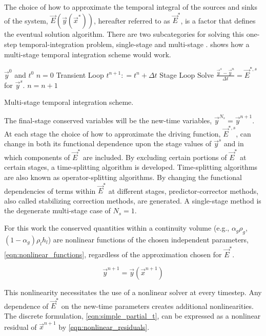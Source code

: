 The choice of how to approximate the temporal integral of the sources and sinks of the system, $\vec{E}(\vec{y}(\vec{x}^{*}))$, hereafter referred to as $\vec{E}^{*}$, is a factor that defines the eventual solution algorithm.
There are two subcategories for solving this one-step temporal-integration problem, single-stage and multi-stage \cite{Stewart1981,LeVeque2007}.
 shows how a multi-stage temporal integration scheme would work.

\begin{algo}[ht!]
\setlength{\baselineskip}{0.625\baselineskip}
\begin{algorithmic}[1]
\Require $\vec{y}^{0}$ and $t^{0}$
\Set $n = 0$
\Loop \; Transient Loop
    \State $t^{n+1} : = t^{n} + \Delta t$
     \; Stage Loop
		\BlackBox Solve $\displaystyle \frac{\vec{y}^{s} - \vec{y}^{n}}{\Delta t} =  \vec{E}^{*,s}$ for $\vec{y}^{s}$.
	\EndFor
	\State $n = n + 1$
\EndLoop
\end{algorithmic}
\caption{Multi-stage temporal integration scheme.}
\label{alg:single_stage_temporal}
\end{algo}

The final-stage conserved variables will be the new-time variables, $\vec{y}^{N_{s}} = \vec{y}^{n+1}$. 
At each stage the choice of how to approximate the driving function, $\vec{E}^{*,s}$, can change in both its functional dependence upon the stage values of $\vec{y}^{s}$ and in which components of $\vec{E}^{*}$ are included.
By excluding certain portions of $\vec{E}^{*}$ at certain stages, a time-splitting algorithm is developed.
Time-splitting algorithms are also known as operator-splitting algorithms. 
By changing the functional dependencies of terms within $\vec{E}^{*}$ at different stages, predictor-corrector methods, also called stabilizing correction methods, are generated. 
A single-stage method is the degenerate multi-stage case of $N_{s} = 1$.

For this work the conserved quantities within a continuity volume (e.g., $\alpha_g \rho_g$, $\left(1-\alpha_g\right)\rho_l h_l$) are nonlinear functions of the chosen independent parameters, \eqref{eqn:nonlinear_functions}, regardless of the approximation chosen for $\vec{E}^{*}$.

\begin{equation}
\label{eqn:nonlinear_functions}
\vec{y}^{n+1} = \vec{y}(\vec{x}^{n+1})
\end{equation}

This nonlinearity necessitates the use of a nonlinear solver at every timestep.
Any dependence of $\vec{E}^{*}$ on the new-time parameters creates additional nonlinearities.
The discrete formulation, \eqref{eqn:simple_partial_t}, can be expressed as a nonlinear residual of $\vec{x}^{n+1}$ by \eqref{eqn:nonlinear_residuals}.

